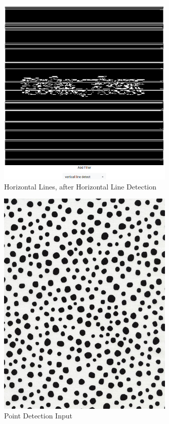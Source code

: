 \documentclass{article}
\begin{document}
  \begin{figure}[!htb]
    \centering
    \includegraphics[width=0.75\textwidth]{assets/horizontal_line_output.png}
    \caption{Horizontal Lines, after Horizontal Line Detection}
    \label{fig:horizontal-line-output}
  \end{figure}

  \begin{figure}[!htb]
    \centering
    \includegraphics[width=0.75\textwidth]{assets/original_points.png}
    \caption{Point Detection Input}
    \label{fig:original-points}
  \end{figure}
\end{document}
